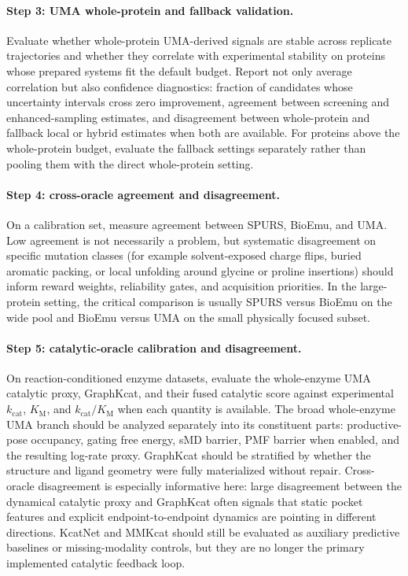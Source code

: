 \documentclass[11pt]{article}
\newcommand{\kcat}{\ensuremath{k_{\mathrm{cat}}}}
\newcommand{\Km}{\ensuremath{K_{\mathrm M}}}
\newcommand{\kcatKm}{\ensuremath{k_{\mathrm{cat}}/K_{\mathrm M}}}
\begin{document}
	\paragraph{Step 3: UMA whole-protein and fallback validation.}
	Evaluate whether whole-protein UMA-derived signals are stable across replicate trajectories and whether they correlate with experimental stability on proteins whose prepared systems fit the default budget. Report not only average correlation but also confidence diagnostics: fraction of candidates whose uncertainty intervals cross zero improvement, agreement between screening and enhanced-sampling estimates, and disagreement between whole-protein and fallback local or hybrid estimates when both are available. For proteins above the whole-protein budget, evaluate the fallback settings separately rather than pooling them with the direct whole-protein setting.
	
	\paragraph{Step 4: cross-oracle agreement and disagreement.}
	On a calibration set, measure agreement between SPURS, BioEmu, and UMA. Low agreement is not necessarily a problem, but systematic disagreement on specific mutation classes (for example solvent-exposed charge flips, buried aromatic packing, or local unfolding around glycine or proline insertions) should inform reward weights, reliability gates, and acquisition priorities. In the large-protein setting, the critical comparison is usually SPURS versus BioEmu on the wide pool and BioEmu versus UMA on the small physically focused subset.
	
	\paragraph{Step 5: catalytic-oracle calibration and disagreement.}
	On reaction-conditioned enzyme datasets, evaluate the whole-enzyme UMA catalytic proxy, GraphKcat, and their fused catalytic score against experimental $\kcat$, $\Km$, and $\kcatKm$ when each quantity is available. The broad whole-enzyme UMA branch should be analyzed separately into its constituent parts: productive-pose occupancy, gating free energy, sMD barrier, PMF barrier when enabled, and the resulting log-rate proxy. GraphKcat should be stratified by whether the structure and ligand geometry were fully materialized without repair. Cross-oracle disagreement is especially informative here: large disagreement between the dynamical catalytic proxy and GraphKcat often signals that static pocket features and explicit endpoint-to-endpoint dynamics are pointing in different directions. KcatNet and MMKcat should still be evaluated as auxiliary predictive baselines or missing-modality controls, but they are no longer the primary implemented catalytic feedback loop.
	
\end{document}
